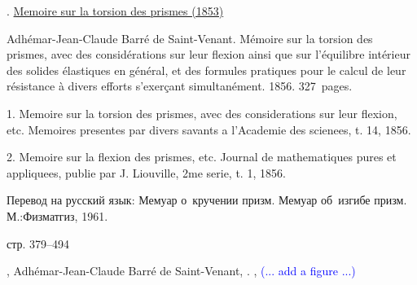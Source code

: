 

\label{section:twistingofrods.saintvenant}

\begin{otherlanguage}{russian}

{\small


.
\href{https://babel.hathitrust.org/cgi/pt?id=hvd.32044091959866&seq=7}{Memoire sur la torsion des prismes (1853)}

Adhémar-Jean-Claude Barré de Saint\hbox{-\hspace{-0.2ex}}Venant.
Mémoire sur la torsion des prismes, avec des considérations sur leur flexion ainsi que sur l'équilibre intérieur des solides élastiques en général, et des formules pratiques pour le calcul de leur résistance à divers efforts s’exerçant simultanément.
1856.
327~pages.

1. Memoire sur la torsion des prismes, avec des considerations sur leur flexion, etc. Memoires presentes par divers savants a l'Academie des scienees, t. 14, 1856.

2. Memoire sur la flexion des prismes, etc. Journal de mathematiques pures et appliquees, publie par J. Liouville, 2me serie, t. 1, 1856.

Перевод на русский язык:
 Мемуар о~кручении призм. Мемуар об~изгибе призм. М.:\;Физ\-мат\-гиз, 1961.

стр. 379--494
\par}

\end{otherlanguage}

,
Adhémar-Jean-Claude Barré de Saint\hbox{-\hspace{-0.2ex}}Venant,
.
 
,
\textcolor{blue}{(... add a figure ...)}

